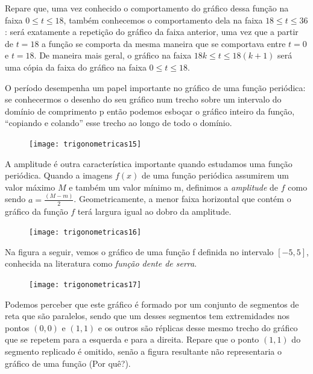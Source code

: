 Repare que, uma vez conhecido o comportamento do gráfico dessa função na faixa $0\leq t\leq18$, também conhecemos o comportamento dela na faixa $18\leq t\leq 36$: será exatamente a repetição do gráfico da faixa anterior, uma vez que a partir de $t=18$ a função se comporta da mesma maneira que se comportava entre $t=0$ e $t=18$. De maneira mais geral, o gráfico na faixa $18k\leq t\leq 18(k+1)$ será uma cópia da faixa do gráfico na faixa $0\leq t\leq 18$.

O período desempenha um papel importante no gráfico de uma função periódica: se conhecermos o desenho do seu gráfico num trecho sobre um intervalo do domínio de comprimento p então podemos esboçar o gráfico inteiro da função, “copiando e colando”{} esse trecho ao longo de todo o domínio.

\begin{figure}[H]
\centering

\texttt{[image: trigonometricas15]}
\end{figure}

A amplitude é outra característica importante quando estudamos uma função periódica. Quando a imagens $f(x)$ de uma função periódica assumirem um valor máximo $M$ e também um valor mínimo m, definimos a \textit{amplitude} de $f$ como sendo $a=\frac{(M-m)}{2}$. Geometricamente, a menor faixa horizontal que contém o gráfico da função $f$ terá largura igual ao dobro da amplitude.

\begin{figure}[H]
\centering

\texttt{[image: trigonometricas16]}
\end{figure}

Na figura a seguir, vemos o gráfico de uma função f definida no intervalo $[-5,5]$, conhecida na literatura como \textit{função dente de serra}.

\begin{figure}[H]
\centering

\texttt{[image: trigonometricas17]}
\end{figure}


Podemos perceber que este gráfico é formado por um conjunto de segmentos de reta que são paralelos, sendo que um desses segmentos tem extremidades nos pontos $(0,0)$ e $(1,1)$ e os outros são réplicas desse mesmo trecho do gráfico que se repetem para a esquerda e para a direita. Repare que o ponto $(1,1)$ do segmento replicado é omitido, senão a figura resultante não representaria o gráfico de uma função (Por quê?).

